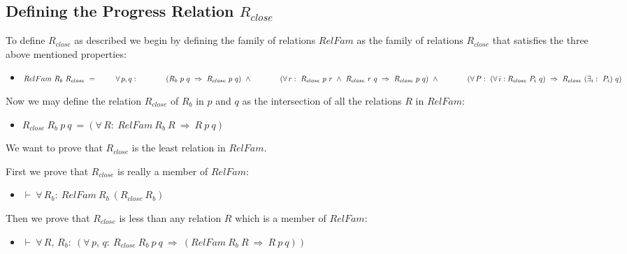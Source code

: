 \subsection*{Defining the Progress Relation $R_{close}$}

To define $R_{close}$ as described we begin by defining the family of
relations $RelFam$ as the family of relations $R_{close}$ that satisfies the
three above mentioned properties:

\bigskip
\begin{itemize}
  \item []
\(RelFam\ R_b\ R_{close}\ =\\
  \cnd \cnd  \forall\, p, q:\\
  \cnd \cnd \cnd (R_b\ p\ q\ \Rightarrow\ R_{close}\ p\ q)\ \wedge\\
  \cnd \cnd \cnd (\forall\, r: \ R_{close}\ p\ r\ \wedge\ R_{close}\ r\ q\
                     \Rightarrow\ R_{close}\ p\ q)\ \wedge\\
  \cnd \cnd \cnd (\forall\, P:\ (\forall\, i: R_{close}\ P_i\ q)\ \Rightarrow\
                              R_{close}\ (\exists_i:\ P_i)\ q)
\)
\end{itemize}

\bigskip
Now we may define the relation $R_{close}$ of $R_b$ in $p$ and $q$ as the
intersection of all the relations $R$ in $RelFam$:

\bigskip
\begin{itemize}
  \item []
\(R_{close}\ R_b\ p\ q\ = (\forall\, R:\ RelFam\ R_b\ R\ \Rightarrow\ R\ p\ q)
\)
\end{itemize}

\bigskip
We want to prove that $R_{close}$ is the least relation in $RelFam$.

\bigskip
First we prove that $R_{close}$ is really a member of $RelFam$:

\bigskip
\begin{itemize}
  \item []
\(\vdash\ \forall\, R_b:\ RelFam\ R_b\ (R_{close}\ R_b)
\)
\end{itemize}

\bigskip
Then we prove that $R_{close}$ is less than any relation $R$ which is a member
of $RelFam$:

\bigskip
\begin{itemize}
  \item []
\(\vdash\ \forall\, R,\, R_b:\ (\forall\, p,\, q:\ R_{close}\ R_b\ p\ q\
    \Rightarrow\ (RelFam\ R_b\ R\ \Rightarrow\ R\ p\ q))
\)
\end{itemize}

